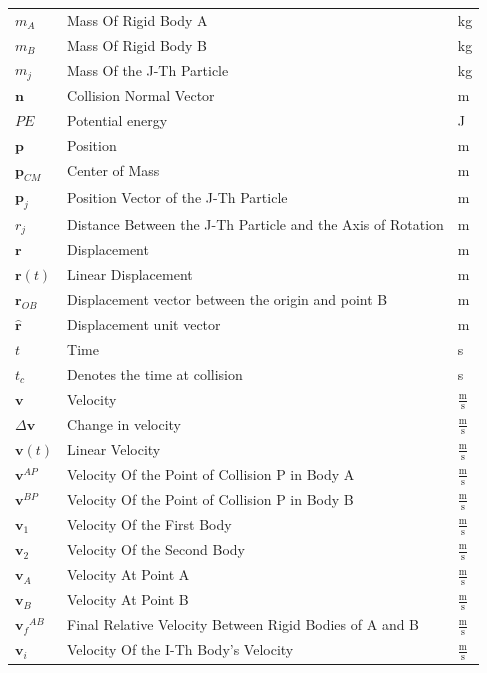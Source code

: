 \documentclass[12pt]{article}
\begin{document}
\begin{longtabu}{l X[l] l}
\\
${m_{A}}$ & Mass Of Rigid Body A & kg
\\
${m_{B}}$ & Mass Of Rigid Body B & kg
\\
${m_{j}}$ & Mass Of the J-Th Particle & kg
\\
$\mathbf{n}$ & Collision Normal Vector & m
\\
$PE$ & Potential energy & J
\\
$\mathbf{p}$ & Position & m
\\
${\mathbf{p}_{CM}}$ & Center of Mass & m
\\
${\mathbf{p}_{j}}$ & Position Vector of the J-Th Particle & m
\\
${r_{j}}$ & Distance Between the J-Th Particle and the Axis of Rotation & m
\\
$\mathbf{r}$ & Displacement & m
\\
$\mathbf{r}(t)$ & Linear Displacement & m
\\
${\mathbf{r}_{OB}}$ & Displacement vector between the origin and point B & m
\\
$\mathbf{\hat{r}}$ & Displacement unit vector & m
\\
$t$ & Time & s
\\
${t_{c}}$ & Denotes the time at collision & s
\\
$\mathbf{v}$ & Velocity & $\frac{\text{m}}{\text{s}}$
\\
$Δ\mathbf{v}$ & Change in velocity & $\frac{\text{m}}{\text{s}}$
\\
$\mathbf{v}(t)$ & Linear Velocity & $\frac{\text{m}}{\text{s}}$
\\
${\mathbf{v}^{AP}}$ & Velocity Of the Point of Collision P in Body A & $\frac{\text{m}}{\text{s}}$
\\
${\mathbf{v}^{BP}}$ & Velocity Of the Point of Collision P in Body B & $\frac{\text{m}}{\text{s}}$
\\
${\mathbf{v}_{1}}$ & Velocity Of the First Body & $\frac{\text{m}}{\text{s}}$
\\
${\mathbf{v}_{2}}$ & Velocity Of the Second Body & $\frac{\text{m}}{\text{s}}$
\\
${\mathbf{v}_{A}}$ & Velocity At Point A & $\frac{\text{m}}{\text{s}}$
\\
${\mathbf{v}_{B}}$ & Velocity At Point B & $\frac{\text{m}}{\text{s}}$
\\
${{\mathbf{v}_{f}}^{AB}}$ & Final Relative Velocity Between Rigid Bodies of A and B & $\frac{\text{m}}{\text{s}}$
\\
${\mathbf{v}_{i}}$ & Velocity Of the I-Th Body's Velocity & $\frac{\text{m}}{\text{s}}$

\end{longtabu}
\end{document}
